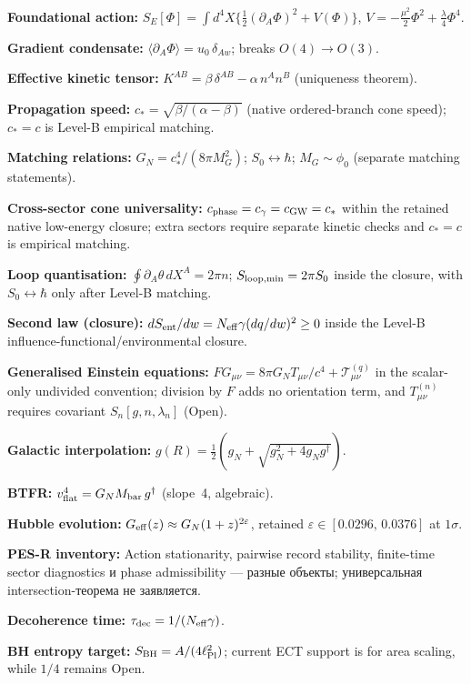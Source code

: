 \documentclass[11pt,a4paper]{article}
\begin{document}
\textbf{Foundational action:}
$S_E[\Phi] = \int d^4X\{\frac{1}{2}(\partial_A\Phi)^2 + V(\Phi)\}$, $V = -\frac{\mu^2}{2}\Phi^2 + \frac{\lambda}{4}\Phi^4$.

\textbf{Gradient condensate:}
$\langle\partial_A\Phi\rangle = u_0\,\delta_{Aw}$; breaks $O(4) \to O(3)$.

\textbf{Effective kinetic tensor:}
$K^{AB} = \beta\,\delta^{AB} - \alpha\,n^An^B$ (uniqueness theorem).

\textbf{Propagation speed:}
$c_*=\sqrt{\beta/(\alpha-\beta)}$ (native ordered-branch cone speed); $c_*=c$ is Level-B empirical matching.

\textbf{Matching relations:}
$G_N=c_*^4/(8\pi M_G^2)$; \quad $S_0\leftrightarrow\hbar$; \quad $M_G\sim\phi_0$ (separate matching statements).

\textbf{Cross-sector cone universality:}
$c_{\rm phase}=c_\gamma=c_{\rm GW}=c_*$ within the retained native low-energy closure; extra sectors require separate kinetic checks and $c_*=c$ is empirical matching.

\textbf{Loop quantisation:}
$\oint \partial_A\theta\,dX^A=2\pi n$; \quad $S_{\rm loop,min}=2\pi S_0$ inside the closure, with $S_0\leftrightarrow\hbar$ only after Level-B matching.

\textbf{Second law (closure):}
$dS_{\rm ent}/dw = N_{\rm eff}\gamma(dq/dw)^2 \geq 0$ inside the Level-B influence-functional/environmental closure.

\textbf{Generalised Einstein equations:}
$F G_{\mu\nu}=8\pi G_N T_{\mu\nu}/c^4+\mathcal T^{(q)}_{\mu\nu}$ in the scalar-only undivided convention; division by $F$ adds no orientation term, and $T^{(n)}_{\mu\nu}$ requires covariant $S_n[g,n,\lambda_n]$ (Open).

\textbf{Galactic interpolation:}
$g(R) = \frac{1}{2}(g_N + \sqrt{g_N^2 + 4g_Ng^\dagger})$.

\textbf{BTFR:}
$v_{\rm flat}^4 = G_N M_{\rm bar}\,g^\dagger$ (slope~4, algebraic).

\textbf{Hubble evolution:}
$G_{\rm eff}(z) \approx G_N(1+z)^{2\varepsilon}$, retained $\varepsilon \in [0.0296,\,0.0376]$ at $1\sigma$.

\textbf{PES-R inventory:}
Action stationarity, pairwise record stability, finite-time sector diagnostics и phase admissibility — разные объекты; универсальная intersection-теорема не заявляется.

\textbf{Decoherence time:}
$\tau_{\rm dec} = 1/(N_{\rm eff}\gamma)$.

\textbf{BH entropy target:}
$S_{\rm BH}=A/(4\ell_{\rm Pl}^2)$; current ECT support is for area scaling, while $1/4$ remains Open.
\end{document}
